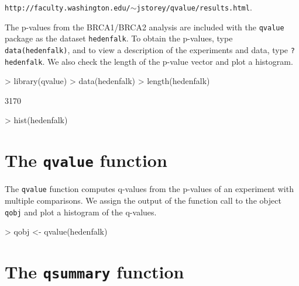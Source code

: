 \documentclass[11pt]{article}
\newcommand{\Rfunction}[1]{{\texttt{#1}}}
\newcommand{\Rpackage}[1]{{\texttt{#1}}}
\begin{document}
\begin{center}
\texttt{http://faculty.washington.edu/$\sim$jstorey/qvalue/results.html}.
\end{center}

The p-values from the BRCA1/BRCA2 analysis are included with the \Rpackage{qvalue} package as the dataset 
\texttt{hedenfalk}.  To obtain the p-values, type \texttt{data(hedenfalk)}, and to view a description of 
the experiments and data, type \texttt{? hedenfalk}.  We also check the length of the p-value vector and plot 
a histogram.\\  

\begin{Schunk}
\begin{Sinput}
> library(qvalue)
> data(hedenfalk)
> length(hedenfalk)
\end{Sinput}
\begin{Soutput}
[1] 3170
\end{Soutput}
\end{Schunk}

\begin{Schunk}
\begin{Sinput}
> hist(hedenfalk)
\end{Sinput}
\end{Schunk}

\section{The \Rfunction{qvalue} function}

The \Rfunction{qvalue} function computes q-values from the p-values of an experiment with multiple comparisons.  
We assign the output of the function call to the object \texttt{qobj} and plot a histogram of the q-values.

\begin{Schunk}
\begin{Sinput}
> qobj <- qvalue(hedenfalk)
\end{Sinput}
\end{Schunk}

\begin{Schunk}
\end{Schunk}

\section{The \Rfunction{qsummary} function}
\end{document}

